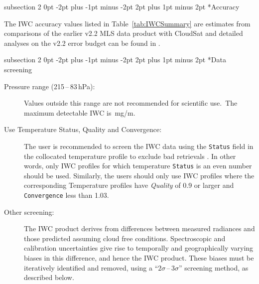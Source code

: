 \documentclass[11pt,draft]{report}
\makeatletter
\renewcommand{\subsection}{\@startsection%
  {subsection}%
  {2}%
  {0pt}%
  {-2pt plus -1pt minus -2pt}%
  {2pt plus 1pt minus 2pt}%
  {\large\sffamily\fontseries{sb}\selectfont\flushleft\color{SectionColor}\figureversion{tabular}}}%
\newcommand{\standardrangestatement}{Values outside this range are not
  recommended for scientific use.}
\makeatother
\begin{document}
\subsection*{Accuracy}

The IWC accuracy values listed in Table~\ref{tab:IWCSummary} are
estimates from comparisons of the earlier v2.2 MLS data product with
CloudSat and detailed analyses on the v2.2 error budget can be found in
\citet{WuEtal08}.

\subsection*{Data screening}
\label{sec:IWCScreening}
\begin{description}
\item[Pressure range (215\,--\,83\,hPa):] \standardrangestatement\ The
  maximum detectable IWC is \,mg/m.
\item[Use Temperature Status, Quality and Convergence:] The user is
  recommended to screen the IWC data using the \texttt{Status} field in
  the collocated temperature profile to exclude bad retrievals
  \citep{SchwartzEtal08}. In other words, only IWC profiles for which
  temperature \texttt{Status} is an even number should be used.
  Similarly, the users should only use IWC profiles where the
  corresponding Temperature profiles have \emph{Quality} of 0.9 or
  larger and \texttt{Convergence} less than 1.03.
\item[Other screening:] The IWC product derives from differences between
  measured radiances and those predicted assuming cloud free conditions.
  Spectroscopic and calibration uncertainties give rise to temporally
  and geographically varying biases in this difference, and hence the
  IWC product.  These biases must be iteratively identified and removed,
  using a ``$2\sigma$\,--\,$3\sigma$'' screening method, as described
  below.


\end{description}
\end{document}
